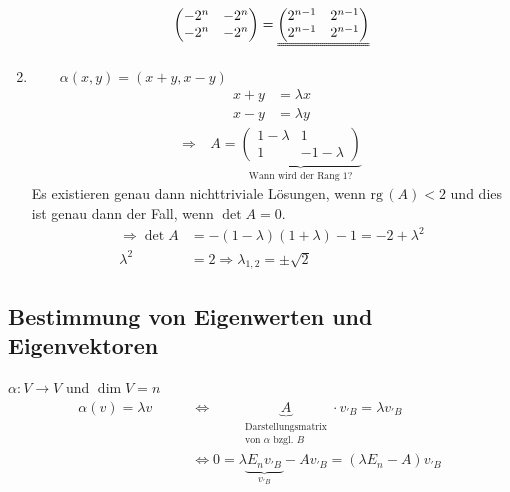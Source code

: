 \documentclass[%
a4paper,
11pt,		%
]
{scrartcl}
\newcommand{\rg}{\text{rg}\,}
\theoremstyle{plain}
\theoremstyle{plain}
\theoremstyle{plain}
\theoremstyle{plain}
\theoremstyle{plain}
\begin{document}
\begin{enumerate}
\begin{align*}
\begin{pmatrix}
                -2^n & -2^n\\
                -2^n & -2^n
            \end{pmatrix}
            =
            \uuline{
            \begin{pmatrix}
                2^{n-1} & 2^{n-1}\\
                2^{n-1} & 2^{n-1}
            \end{pmatrix}
            }
        \end{align*}
    \item $\qquad\alpha(x,y) = (x+y,x-y)$
        \begin{align*}
            x+y & = \lambda x\\
            x-y & = \lambda y
        \end{align*}
        \begin{align*}
            \Rightarrow\ &
            A = 
            \underbrace{
            \begin{pmatrix}
                1-\lambda & 1\\
                1 & -1-\lambda 
            \end{pmatrix}}_{\text{Wann wird der Rang 1?}}
        \end{align*}
        Es existieren genau dann nichttriviale Lösungen, wenn $\rg(A)<2$ und dies ist genau dann der Fall, wenn $\det A=0$.
        \begin{align*}
            \Rightarrow \det A & = -(1-\lambda)(1+\lambda)-1 = -2+\lambda^2\\
            \lambda^2 & = 2 \Rightarrow \lambda_{1,2} = \pm \sqrt{2}
        \end{align*}
\end{enumerate}
\subsection{Bestimmung von Eigenwerten und Eigenvektoren} %
\label{sub:Bestimmung von Eigenwerten und Eigenvektoren}
$\alpha: V \to V$ und $\dim V = n$
\begin{align*}
    \alpha(v) = \lambda v \qquad & \Leftrightarrow \qquad \underbrace{A}_{\substack{\text{Darstellungsmatrix}\\ \text{von $\alpha$ bzgl. $B$}}} \cdot  v_{'B} = \lambda v_{'B}\\
    & \Leftrightarrow 0 = \lambda \underbrace{E_n v_{'B}}_{v_{'B}} - Av_{'B} = (\lambda E_n - A)v_{'B} \tag{$\star$} \label{eqn:LambdaEMinusA}
\end{align*}
\end{document}
